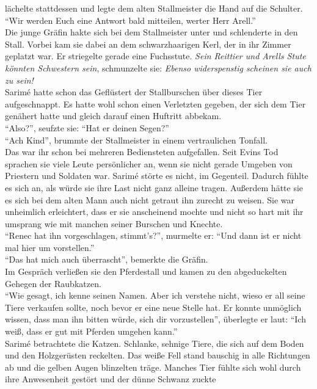 lächelte stattdessen und legte dem alten Stallmeister die Hand auf die Schulter. ``Wir werden Euch 
eine Antwort bald mitteilen, werter Herr Arell.''\\
Die junge Gräfin hakte sich bei dem Stallmeister unter und schlenderte in den Stall. Vorbei kam sie 
dabei an dem schwarzhaarigen Kerl, der in ihr Zimmer geplatzt war. Er striegelte gerade eine 
Fuchsstute. \textit{Sein Reittier und Arells Stute könnten Schwestern sein}, schmunzelte sie: 
\textit{Ebenso widerspenstig scheinen sie auch zu sein!}\\
Sarimé hatte schon das Geflüstert der Stallburschen über dieses Tier aufgeschnappt. Es hatte wohl 
schon einen Verletzten gegeben, der sich dem Tier genähert hatte und gleich darauf einen Huftritt 
abbekam.\\
``Also?'', seufzte sie: ``Hat er deinen Segen?''\\
``Ach Kind'', brummte der Stallmeister in einem vertraulichen Tonfall.\\
Das war ihr schon bei mehreren Bediensteten aufgefallen. Seit Evins Tod sprachen sie viele Leute 
persönlicher an, wenn sie nicht gerade Umgeben von Priestern und Soldaten war. Sarimé störte es 
nicht, im Gegenteil. Dadurch fühlte es sich an, als würde sie ihre Last nicht ganz alleine tragen. 
Außerdem hätte sie es sich bei dem alten Mann auch nicht getraut ihn zurecht zu weisen. Sie war 
unheimlich erleichtert, dass er sie anscheinend mochte und nicht so hart mit ihr umsprang wie mit 
manchen seiner Burschen und Knechte.\\
``Renec hat ihn vorgeschlagen, stimmt's?'', murmelte er: ``Und dann ist er nicht mal hier um 
vorstellen.''\\
``Das hat mich auch überrascht'', bemerkte die Gräfin.\\
Im Gespräch verließen sie den Pferdestall und kamen zu den abgeduckelten Gehegen der Raubkatzen.\\
``Wie gesagt, ich kenne seinen Namen. Aber ich verstehe nicht, wieso er all seine Tiere verkaufen 
sollte, noch bevor er eine neue Stelle hat. Er konnte unmöglich wissen, dass man ihn bitten würde, 
sich dir vorzustellen'', überlegte er laut: ``Ich weiß, dass er gut mit Pferden umgehen kann.''\\
Sarimé betrachtete die Katzen. Schlanke, sehnige Tiere, die sich auf dem Boden und den Holzgerüsten 
reckelten. Das weiße Fell stand bauschig in alle Richtungen ab und die gelben Augen blinzelten 
träge. Manches Tier fühlte sich wohl durch ihre Anwesenheit gestört und der dünne Schwanz zuckte 
